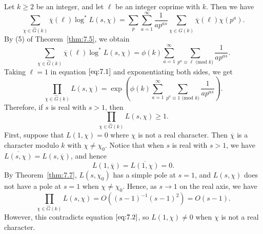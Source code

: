 \begin{pf}
    Let $k \geq 2$ be an integer, and let $\ell$ be an integer coprime with $k$. 
    Then we have 
    \[ \sum_{\chi\in\hat G(k)} \overline\chi(\ell) \log^* L(s, \chi) 
    = \sum_p \sum_{a=1}^\infty \frac{1}{ap^{as}} \sum_{\chi\in\hat G(k)} 
    \overline\chi(\ell) \chi(p^a). \] 
    By (5) of Theorem~\ref{thm:7.5}, we obtain 
    \begin{equation}\label{eq:7.1}
        \sum_{\chi\in\hat G(k)} \overline\chi(\ell) \log^* L(s, \chi) 
        = \phi(k) \sum_{a=1}^\infty \sum_{p^a\equiv\ell\text{ (mod }k)} \frac{1}{ap^{as}}. 
    \end{equation}
    Taking $\ell = 1$ in equation $\eqref{eq:7.1}$ and exponentiating both sides, 
    we get 
    \[ \prod_{\chi\in\hat G(k)} L(s, \chi) = \exp\left( 
        \phi(k) \sum_{a=1}^\infty \sum_{p^a\equiv1\text{ (mod }k)} \frac{1}{ap^{as}} 
        \right). \] 
    Therefore, if $s$ is real with $s > 1$, then 
    \begin{equation}\label{eq:7.2}
        \prod_{\chi\in\hat G(k)} L(s,\chi) \geq 1. 
    \end{equation}
    First, suppose that $L(1, \chi) = 0$ where $\chi$ is not a real character. 
    Then $\overline\chi$ is a character modulo $k$ with $\chi \neq \chi_0$. 
    Notice that when $s$ is real with $s > 1$, we have $\overline{L(s,\chi)} 
    = L(s,\overline\chi)$, and hence 
    \[ L(1, \overline\chi) = \overline{L(1, \chi)} = 0. \] 
    By Theorem~\ref{thm:7.7}, $L(s, \chi_0)$ has a simple pole at $s = 1$, 
    and $L(s, \chi)$ does not have a pole at $s = 1$ when $\chi \neq \chi_0$. 
    Hence, as $s \to 1$ on the real axis, we have 
    \[ \prod_{\chi\in\hat G(k)} L(s, \chi) = O((s-1)^{-1} (s-1)^2) = O(s-1). \] 
    However, this contradicts equation $\eqref{eq:7.2}$, so $L(1, \chi) \neq 0$ 
    when $\chi$ is not a real character. 


\end{pf}
